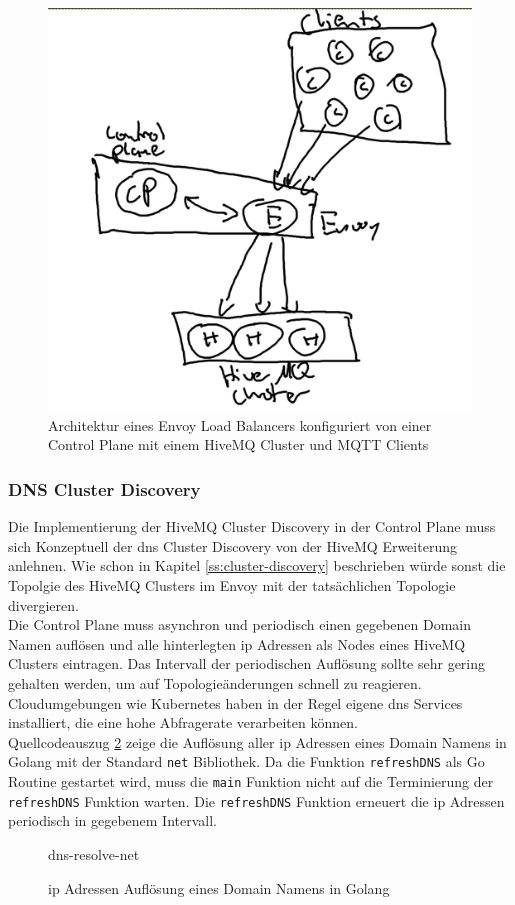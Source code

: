 \begin{figure}
    \centering
    \includegraphics[scale=0.5]{images/control-plane-architecture.png}
    \caption{Architektur eines Envoy Load Balancers konfiguriert von einer Control Plane mit einem HiveMQ Cluster und MQTT Clients}
    \label{fig:control-plane-architecture}
\end{figure}

\subsubsection{DNS Cluster Discovery} \label{ss:dns-discovery}
Die Implementierung der HiveMQ Cluster Discovery in der Control Plane muss sich Konzeptuell der \ac{dns} Cluster Discovery von der HiveMQ Erweiterung anlehnen. Wie schon in Kapitel \ref{ss:cluster-discovery} beschrieben würde sonst die Topolgie des HiveMQ Clusters im Envoy mit der tatsächlichen Topologie divergieren.
\\
Die Control Plane muss asynchron und periodisch einen gegebenen Domain Namen auflösen und alle hinterlegten \ac{ip} Adressen als Nodes eines HiveMQ Clusters eintragen. Das Intervall der periodischen Auflösung sollte sehr gering gehalten werden, um auf Topologieänderungen schnell zu reagieren.
Cloudumgebungen wie Kubernetes haben in der Regel eigene \ac{dns} Services installiert, die eine hohe Abfragerate verarbeiten können.
\\
Quellcodeauszug \ref{code:dns-resolve-net} zeige die Auflösung aller \ac{ip} Adressen eines Domain Namens in Golang mit der Standard \verb|net| Bibliothek. Da die Funktion \verb|refreshDNS| als Go Routine gestartet wird, muss die \verb|main| Funktion nicht auf die Terminierung der \verb|refreshDNS| Funktion warten. Die \verb|refreshDNS| Funktion erneuert die \ac{ip} Adressen periodisch in gegebenem Intervall.
\begin{figure}
    {dns-resolve-net}
    \caption{\ac{ip} Adressen Auflösung eines Domain Namens in Golang}
    \label{code:dns-resolve-net}
\end{figure}

